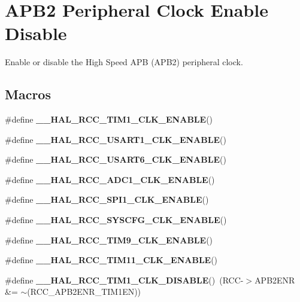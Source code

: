 \hypertarget{group___r_c_c___a_p_b2___clock___enable___disable}{}\section{A\+P\+B2 Peripheral Clock Enable Disable}
\label{group___r_c_c___a_p_b2___clock___enable___disable}


Enable or disable the High Speed A\+PB (A\+P\+B2) peripheral clock.  


\subsection*{Macros}
\begin{DoxyCompactItemize}
\item 
\#define {\bfseries \+\_\+\+\_\+\+H\+A\+L\+\_\+\+R\+C\+C\+\_\+\+T\+I\+M1\+\_\+\+C\+L\+K\+\_\+\+E\+N\+A\+B\+LE}()
\item 
\#define {\bfseries \+\_\+\+\_\+\+H\+A\+L\+\_\+\+R\+C\+C\+\_\+\+U\+S\+A\+R\+T1\+\_\+\+C\+L\+K\+\_\+\+E\+N\+A\+B\+LE}()
\item 
\#define {\bfseries \+\_\+\+\_\+\+H\+A\+L\+\_\+\+R\+C\+C\+\_\+\+U\+S\+A\+R\+T6\+\_\+\+C\+L\+K\+\_\+\+E\+N\+A\+B\+LE}()
\item 
\#define {\bfseries \+\_\+\+\_\+\+H\+A\+L\+\_\+\+R\+C\+C\+\_\+\+A\+D\+C1\+\_\+\+C\+L\+K\+\_\+\+E\+N\+A\+B\+LE}()
\item 
\#define {\bfseries \+\_\+\+\_\+\+H\+A\+L\+\_\+\+R\+C\+C\+\_\+\+S\+P\+I1\+\_\+\+C\+L\+K\+\_\+\+E\+N\+A\+B\+LE}()
\item 
\#define {\bfseries \+\_\+\+\_\+\+H\+A\+L\+\_\+\+R\+C\+C\+\_\+\+S\+Y\+S\+C\+F\+G\+\_\+\+C\+L\+K\+\_\+\+E\+N\+A\+B\+LE}()
\item 
\#define {\bfseries \+\_\+\+\_\+\+H\+A\+L\+\_\+\+R\+C\+C\+\_\+\+T\+I\+M9\+\_\+\+C\+L\+K\+\_\+\+E\+N\+A\+B\+LE}()
\item 
\#define {\bfseries \+\_\+\+\_\+\+H\+A\+L\+\_\+\+R\+C\+C\+\_\+\+T\+I\+M11\+\_\+\+C\+L\+K\+\_\+\+E\+N\+A\+B\+LE}()
\item 
\mbox{\label{group___r_c_c___a_p_b2___clock___enable___disable_gaa9eacfb8ee244074ec63dae0b9f621c2}} 
\#define {\bfseries \+\_\+\+\_\+\+H\+A\+L\+\_\+\+R\+C\+C\+\_\+\+T\+I\+M1\+\_\+\+C\+L\+K\+\_\+\+D\+I\+S\+A\+B\+LE}()~(R\+CC-\/$>$A\+P\+B2\+E\+NR \&= $\sim$(R\+C\+C\+\_\+\+A\+P\+B2\+E\+N\+R\+\_\+\+T\+I\+M1\+EN))
\item 

\end{DoxyCompactItemize}
